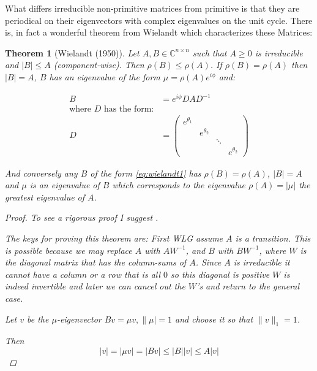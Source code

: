\documentclass[a4paper,10pt]{article}
\newcommand{\C}{\mathbb{C}}
\theoremstyle{definition}
\theoremstyle{remark}
\theoremstyle{plain}
\newtheorem{thm}{Theorem}[section]
\begin{document}
What differs irreducible non-primitive matrices from primitive is
that they are periodical on their eigenvectors with complex eigenvalues
on the unit cycle. There is, in fact a wonderful theorem from Wielandt which
characterizes these Matrices:

\begin{thm}[Wielandt (1950)]
\label{thm:wielandt}
Let $A,B \in \C^{n \times n}$ such that $A \geq 0$ is irreducible and $|B| \leq
A$ (component-wise). Then $\rho(B) \leq \rho(A)$.
If $\rho(B)=\rho(A)$ then $|B|=A$, $B$ has an eigenvalue of the form $\mu =
\rho(A)e^{i \phi}$ and:

\begin{equation}
\begin{aligned}
\label{eq:wielandt1}
B &= 
e^{i \phi}DAD^{-1} \\ 
\text{where } D \text{ has the form:}\\
D &= 
\begin{pmatrix}
e^{\theta_1} & & & \\
& e^{\theta_2} & & \\
& & \ddots & \\
& & & e^{\theta_2}
\end{pmatrix}
\end{aligned}
\end{equation}

And conversely any $B$ of the form \ref{eq:wielandt1}
has $\rho(B) = \rho(A)$, $|B|=A$ and $\mu$ is an eigenvalue of $B$ which
corresponds to the eigenvalue $\rho(A)=|\mu|$ the greatest eigenvalue of $A$.

\begin{proof}
To see a rigorous proof I suggest \textcite{meyer2000matrix}.

The keys for proving this theorem are:
First WLG assume $A$ is a transition. This is possible because we may replace
$A$ with $AW^{-1}$, and $B$ with
$BW^{-1}$, where $W$ is the diagonal matrix that has the column-sums of $A$.
Since $A$ is irreducible it cannot have a column or a row that is all $0$
so this diagonal is positive $W$ is indeed invertible and later we can cancel out the
$W$'s and return to the general case.

Let $v$ be the $\mu$-eigenvector $Bv = \mu v, \|\mu|=1$ and choose it so that 
$\|v\|_1=1$.

Then 
\begin{equation}
|v| = |\mu v| = |B v| \leq |B| |v|
\leq A |v|
\end{equation}


\end{proof}
\end{thm}
\end{document}
